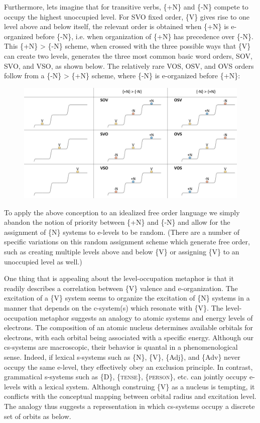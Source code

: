   Furthermore, lets imagine that for transitive verbs, \{+N\} and \{-N\} compete to occupy the highest unoccupied level. For SVO fixed order, \{V\} gives rise to one level above and below itself, the relevant order is obtained when \{+N\} is e-organized before \{-N\}, i.e. when organization of \{+N\} has precedence over \{-N\}. This \{+N\} > \{-N\} scheme, when crossed with the three possible ways that \{V\} can create two levels, generates the three most common basic word orders, SOV, SVO, and VSO, as shown below. The relatively rare VOS, OSV, and OVS orders follow from a \{-N\} > \{+N\} scheme, where \{-N\} is e-organized before \{+N\}:

  
\begin{figure}
\includegraphics[width=\textwidth]{figures/Tilsen-img75.png}
\caption{\missingcaption}
\label{fig:4:25}
\end{figure}
 

  To apply the above conception to an idealized free order language we simply abandon the notion of priority between \{+N\} and \{-N\} and allow for the assignment of \{N\} systems to e-levels to be random. (There are a number of specific variations on this random assignment scheme which generate free order, such as creating multiple levels above and below \{V\} or assigning \{V\} to an unoccupied level as well.)

  One thing that is appealing about the level-occupation metaphor is that it readily describes a correlation between \{V\} valence and e-organization. The excitation of a \{V\} system seems to organize the excitation of \{N\} systems in a manner that depends on the c-system(s) which resonate with \{V\}. The level-occupation metaphor suggests an analogy to atomic systems and energy levels of electrons. The composition of an atomic nucleus determines available orbitals for electrons, with each orbital being associated with a specific energy. Although our cs-systems are macroscopic, their behavior is quantal in a phenomenological sense. Indeed, if lexical s-systems such as \{N\}, \{V\}, \{Adj\}, and \{Adv\} never occupy the same e-level, they effectively obey an exclusion principle. In contrast, grammatical s-systems such as \{D\}, \{\textsc{tense}\}, \{\textsc{person}\}, etc. can jointly occupy e-levels with a lexical system. Although construing \{V\} as a nucleus is tempting, it conflicts with the conceptual mapping between orbital radius and excitation level. The analogy thus suggests a representation in which cs-systems occupy a discrete set of orbits as below.

